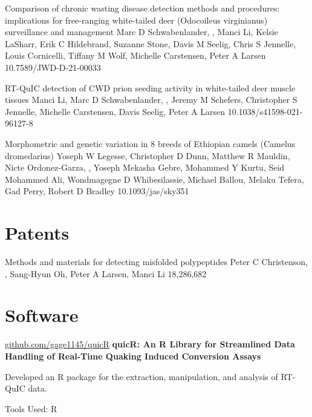 \documentclass{resume}
\begin{document}
\begin{samepage}
            {Comparison of chronic wasting disease detection methods and procedures: implications for free-ranging white-tailed deer (Odocoileus virginianus) surveillance and management}
            {Marc D Schwabenlander, \me, Manci Li, Kelsie LaSharr, Erik C Hildebrand, Suzanne Stone, Davis M Seelig, Chris S Jennelle, Louis Cornicelli, Tiffany M Wolf, Michelle Carstensen, Peter A Larsen}
            {10.7589/JWD-D-21-00033}
            
            {RT-QuIC detection of CWD prion seeding activity in white-tailed deer muscle tissues}
            {Manci Li, Marc D Schwabenlander, \me, Jeremy M Schefers, Christopher S Jennelle, Michelle Carstensen, Davis Seelig, Peter A Larsen}
            {10.1038/s41598-021-96127-8}

            {Morphometric and genetic variation in 8 breeds of Ethiopian camels (Camelus dromedarius)}
            {Yoseph W Legesse, Christopher D Dunn, Matthew R Mauldin, Nicte Ordonez-Garza, \me, Yoseph Mekasha Gebre, Mohammed Y Kurtu, Seid Mohammed Ali, Wondmagegne D Whibesilassie, Michael Ballou, Melaku Tefera, Gad Perry, Robert D Bradley}
            {10.1093/jas/sky351}

        \end{samepage}


    \section{Patents}

        \begin{samepage}
            {Methods and materials for detecting misfolded polypeptides}
            {Peter C Christenson, \me, Sang-Hyun Oh, Peter A Larsen, Manci Li}
            {18,286,682}
        \end{samepage}
    

    \section{Software}

        \begin{software}{\href{https://github.com/gage1145/quicR}{github.com/gage1145/quicR}}
            \textbf{quicR: An R Library for Streamlined Data Handling of Real-Time Quaking Induced Conversion Assays}
        \end{software}
        \begin{highlights}
            \item Developed an R package for the extraction, manipulation, and analysis of RT-QuIC data.
            \item Tools Used: R
        \end{highlights}
\end{document}
